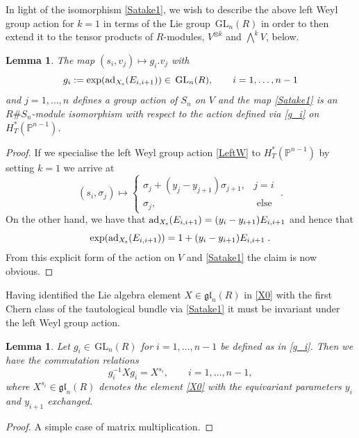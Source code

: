\documentclass[12pt]{amsart}
\newcommand{\GL}{\,\mathrm{GL}}
\newcommand{\mb}[1]{\mathbb{#1}}
\newcommand{\ring}{R}
\newcommand{\ad}{\operatorname{ad}}
\newtheorem{lemma}[prop]{Lemma}
\numberwithin{equation}{section}
\numberwithin{figure}{section}
\newcommand{\gl}{\mathfrak{gl}}
\begin{document}
In light of the isomorphism \eqref{Satake1}, we wish to describe the above left Weyl group action for $k=1$ in terms of the Lie group $\GL_n(\ring)$ in order to then extend it to the tensor products of $\ring$-modules, $V^{\otimes k}$ and $\bigwedge^kV$, below.
\begin{lemma}\label{lem:Waction}
The map $(s_i,v_j)\mapsto g_i.v_j$ with 
\begin{equation}\label{g_i}
g_i:=\exp(\ad_{X_{\rm s}}(E_{i,i+1}))\in\GL_n(\ring),\qquad i=1,\ldots,n-1
\end{equation}
and $j=1,\ldots,n$ defines a group action of $S_n$ on $V$ and the map \eqref{Satake1} is an $\ring\#S_n$-module isomorphism with respect to the action defined via \eqref{g_i} on $H^*_T(\mb{P}^{n-1})$.
\end{lemma}

\begin{proof}
If we specialise the left Weyl group action \eqref{LeftW} to $H^*_T(\mb{P}^{n-1})$ by setting $k=1$ we arrive at
\begin{equation}\label{LeftW1}
(s_i,\sigma_j)\mapsto\left\{\begin{array}{ll}
\sigma_j+(y_j-y_{j+1})\sigma_{j+1},& j=i\\
\sigma_j,&\text{ else}
\end{array}
\right.\;.
\end{equation}
On the other hand, we have that $\ad_{X_{\rm s}}(E_{i,i+1})=(y_i-y_{i+1})E_{i,i+1}$ and hence that
\[
\exp(\ad_{X_{\rm s}}(E_{i,i+1}))=1+(y_i-y_{i+1})E_{i,i+1}\;.
\]
From this explicit form of the action on $V$ and \eqref{Satake1} the claim is now obvious.
\end{proof}

Having identified the Lie algebra element $X\in\gl_n(\ring)$ in \eqref{X0} with the first Chern class of the tautological bundle via \eqref{Satake1} it must be invariant under the left Weyl group action.
\begin{lemma}\label{lem:Winvariance}
    Let $g_i\in\GL_n(\ring)$ for $i=1,\ldots,n-1$ be defined as in \eqref{g_i}. Then we have the commutation relations
    \begin{equation}\label{Winvariance}
    g_i^{-1}Xg_i=X^{s_i},\qquad i=1,\ldots,n-1,
    \end{equation}
    where $X^{s_i}\in\gl_n(\ring)$ denotes the element \eqref{X0} with the equivariant parameters $y_i$ and $y_{i+1}$ exchanged.
\end{lemma}

\begin{proof}
    A simple case of matrix multiplication.
\end{proof}
\end{document}
